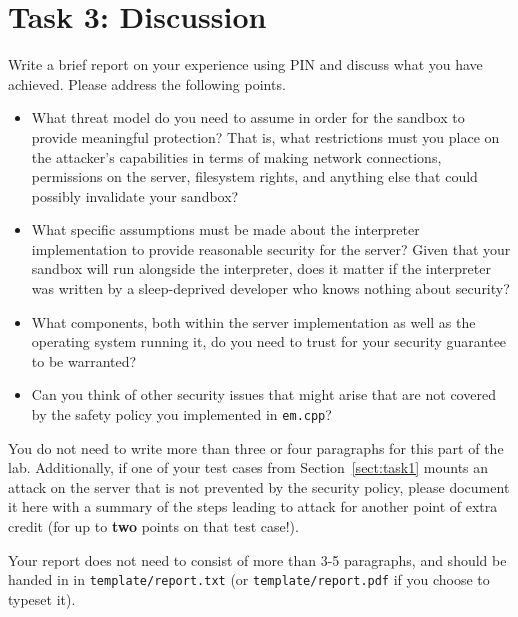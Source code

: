 \documentclass[11pt]{article}
\begin{document}
\section{Task 3: Discussion}

Write a brief report on your experience using PIN and discuss what you have achieved. Please address the following points.
\begin{itemize}
    \item What threat model do you need to assume in order for the sandbox to provide meaningful protection? That is, what restrictions must you place on the attacker's capabilities in terms of making network connections, permissions on the server, filesystem rights, and anything else that could possibly invalidate your sandbox?
    \item What specific assumptions must be made about the interpreter implementation to provide reasonable security for the server? Given that your sandbox will run alongside the interpreter, does it matter if the interpreter was written by a sleep-deprived developer who knows nothing about security?
    \item What components, both within the server implementation as well as the operating system running it, do you need to trust for your security guarantee to be warranted?
    \item Can you think of other security issues that might arise that are not covered by the safety policy you implemented in \verb'em.cpp'?
\end{itemize}
You do not need to write more than three or four paragraphs for this part of the lab. Additionally, if one of your test cases from Section~\ref{sect:task1} mounts an attack on the server that is not prevented by the security policy, please document it here with a summary of the steps leading to attack for another point of extra credit (for up to \textbf{two} points on that test case!).

Your report does not need to consist of more than 3-5 paragraphs, and should be handed in in \verb'template/report.txt' (or \verb'template/report.pdf' if you choose to typeset it).
\end{document}
